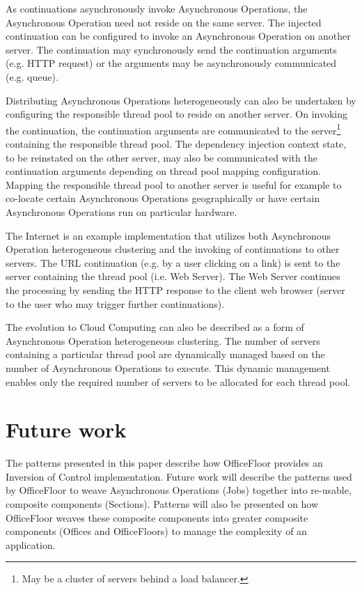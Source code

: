 \documentclass[prodmode]{style/acmlarge}
\begin{document}
As continuations asynchronously invoke Asynchronous Operations, the Asynchronous
Operation need not reside on the same server.  The injected continuation can be
configured to invoke an Asynchronous Operation on another server.  The
continuation may synchronously send the continuation arguments (e.g. HTTP
request) or the arguments may be asynchronously communicated (e.g.
queue).

Distributing Asynchronous Operations heterogeneously can also be undertaken by
configuring the responsible thread pool to reside on another server.  On
invoking the continuation, the continuation arguments are communicated to the
server\footnote{May be a cluster of servers behind a load balancer.} containing
the responsible thread pool.  The dependency injection context state, to be
reinstated on the other server, may also be communicated with the continuation
arguments depending on thread pool mapping configuration.  Mapping the
responsible thread pool to another server is useful for example to co-locate
certain Asynchronous Operations geographically or have certain Asynchronous
Operations run on particular hardware.

The Internet is an example implementation that utilizes both Asynchronous
Operation heterogeneous clustering and the invoking of continuations to other
servers.  The URL continuation (e.g. by a user clicking on a link) is sent to
the server containing the thread pool (i.e. Web Server).  The Web Server
continues the processing by sending the HTTP response to the client web browser
(server to the user who may trigger further continuations).

The evolution to Cloud Computing can also be described as a form of Asynchronous
Operation heterogeneous clustering.  The number of servers containing a
particular thread pool are dynamically managed based on the number of
Asynchronous Operations to execute.  This dynamic management enables only the
required number of servers to be allocated for each thread pool.



\section{Future work}

The patterns presented in this paper describe how OfficeFloor \cite{officefloor}
provides an Inversion of Control implementation.  Future work will describe the
patterns used by OfficeFloor to weave Asynchronous Operations (Jobs) together
into re-usable, composite components (Sections).  Patterns will also be
presented on how OfficeFloor weaves these composite components into greater
composite components (Offices and OfficeFloors) to manage the complexity of an
application.
\end{document}
